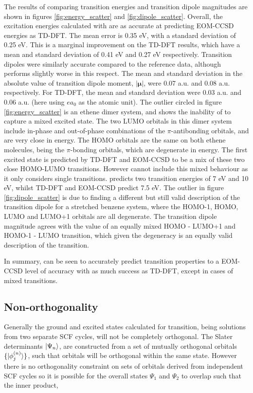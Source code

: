 The results of comparing transition energies and transition dipole magnitudes are
shown in figures \ref{fig:energy_scatter} and \ref{fig:dipole_scatter}. Overall, 
the excitation energies calculated with \dscf are as accurate at predicting EOM-CCSD
energies as TD-DFT. The mean error is 0.35 eV, with a standard deviation of 0.25 eV.
This is a marginal improvement on the TD-DFT results, which have a mean and standard
deviation of 0.41 eV and 0.27 eV respectively. Transition dipoles were similarly
accurate compared to the reference data, although \dscf performs slightly worse
in this respect. The mean and standard deviation in the absolute value of transition
dipole moment, $|\mathbf{\mu}|$, were 0.07 a.u. and 0.08 a.u. respectively. For 
TD-DFT, the mean and standard deviation were 0.03 a.u. and 0.06 a.u. (here using 
$ea_0$ as the atomic unit).
The outlier circled in figure \ref{fig:energy_scatter} is an ethene dimer system,
and shows the inability of \dscf to capture a mixed excited state. The two LUMO
orbitals in this dimer system include in-phase and out-of-phase combinations of the 
$\pi$-antibonding orbitals, and are very close in energy. The HOMO orbitals are
the same on both ethene molecules, being the $\pi$-bonding orbitals, which are
degenerate in energy. The first excited state is predicted by TD-DFT and EOM-CCSD
to be a mix of these two close HOMO-LUMO transitions. However \dscf cannot include
this mixed behaviour as it only considers single transitions. \dscf predicts two
transition energies of 7 eV and 10 eV, whilst TD-DFT and EOM-CCSD predict 7.5 eV.
The outlier in figure \ref{fig:dipole_scatter} is due to \dscf finding a different
but still valid description of the transition dipole for a stretched benzene system,
where the HOMO-1, HOMO, LUMO and LUMO+1 orbitals are all degenerate. The \dscf transition
dipole magnitude agrees with the value of an equally mixed HOMO - LUMO+1 and HOMO-1 
- LUMO transition, which given the degeneracy is an equally valid description of 
the transition.

In summary, \dscf can be seen to accurately predict transition properties
to a EOM-CCSD level of accuracy with as much success as TD-DFT, except in cases
of mixed transitions. 

\subsection{Non-orthogonality}
\label{subsec:dscf_nonorth}
Generally the ground and excited states calculated for \dscf transition, being solutions
from two separate SCF cycles, will not be completely orthogonal. The Slater determinants
$\ket{\Psi_n}$, are constructed from a set of mutually orthogonal orbitals $\{ \ket{\phi_j^{\left(n\right)}} \}$,
such that orbitals will be orthogonal within the same state. However there is no 
orthogonality constraint on sets of orbitals derived from independent SCF cycles
so it is possible for the overall states $\Psi_1$ and $\Psi_2$ to overlap such 
that the inner product,

